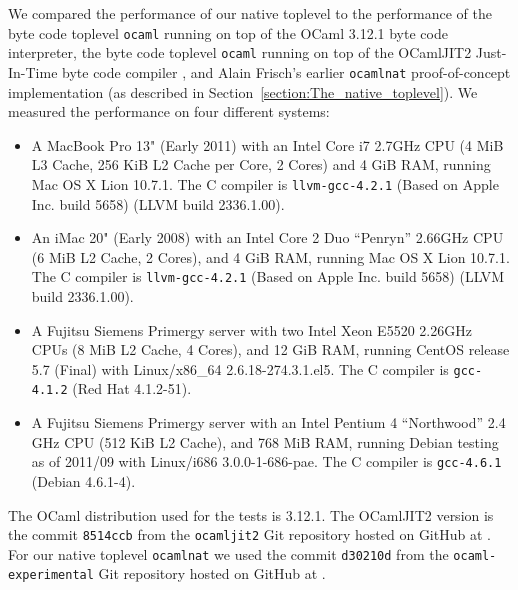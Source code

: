 \documentclass[10pt,a4paper,draft,twocolumn]{article}
\begin{document}
We compared the performance of our native toplevel to the performance of the byte code toplevel
\texttt{ocaml} running on top of the OCaml 3.12.1 byte code interpreter, the byte code toplevel
\texttt{ocaml} running on top of the OCamlJIT2 Just-In-Time byte code compiler
\cite{Meurer10jit,Meurer10ocamljit,Meurer11ocamljit2}, and Alain Frisch's earlier \texttt{ocamlnat}
proof-of-concept implementation (as described in Section~\ref{section:The_native_toplevel}).
 We measured the performance on four different systems:
\begin{itemize}
\item A MacBook Pro 13" (Early 2011) with an Intel Core i7 2.7GHz CPU (4 MiB L3 Cache, 256 KiB L2 Cache per Core,
  2 Cores) and 4 GiB RAM, running Mac OS X Lion 10.7.1. The C compiler is
  \texttt{llvm-gcc-4.2.1} (Based on Apple Inc. build 5658) (LLVM build 2336.1.00).
\item An iMac 20" (Early 2008) with an Intel Core 2 Duo ``Penryn'' 2.66GHz CPU (6 MiB L2 Cache, 2 Cores),
  and 4 GiB RAM, running Mac OS X Lion 10.7.1. The C compiler is
  \texttt{llvm-gcc-4.2.1} (Based on Apple Inc. build 5658) (LLVM build 2336.1.00).
\item A Fujitsu Siemens Primergy server with two Intel Xeon E5520 2.26GHz CPUs (8 MiB L2 Cache, 4 Cores),
  and 12 GiB RAM, running CentOS release 5.7 (Final) with Linux/x86\_64 2.6.18-274.3.1.el5.
  The C compiler is \texttt{gcc-4.1.2} (Red Hat 4.1.2-51).
\item A Fujitsu Siemens Primergy server with an Intel Pentium 4 ``Northwood'' 2.4 GHz CPU (512 KiB L2 Cache),
  and 768 MiB RAM, running Debian testing as of 2011/09 with Linux/i686 3.0.0-1-686-pae.
  The C compiler is \texttt{gcc-4.6.1} (Debian 4.6.1-4).
\end{itemize}

The OCaml distribution used for the tests is 3.12.1. The OCamlJIT2 version is the commit \texttt{8514ccb}
from the \texttt{ocamljit2} Git repository hosted on GitHub at \cite{Meurer11ocamljit2}. For
our native toplevel \texttt{ocamlnat} we used the commit \texttt{d30210d} from the \texttt{ocaml-experimental}
Git repository hosted on GitHub at \cite{Meurer11ocamlexperimental}.
\end{document}
